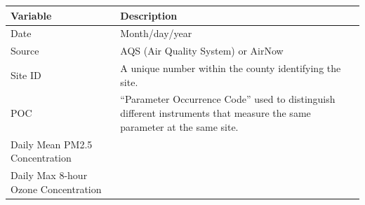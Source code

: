 \documentclass[12pt,]{article}
\begin{document}
\begin{longtable}[]{@{}ll@{}}
\toprule
\begin{minipage}[b]{0.65\columnwidth}\raggedright
Variable\strut
\end{minipage} & \begin{minipage}[b]{0.29\columnwidth}\raggedright
Description\strut
\end{minipage}\tabularnewline
\midrule
\endhead
\begin{minipage}[t]{0.65\columnwidth}\raggedright
Date\strut
\end{minipage} & \begin{minipage}[t]{0.29\columnwidth}\raggedright
Month/day/year\strut
\end{minipage}\tabularnewline
\begin{minipage}[t]{0.65\columnwidth}\raggedright
Source\strut
\end{minipage} & \begin{minipage}[t]{0.29\columnwidth}\raggedright
AQS (Air Quality System) or AirNow\strut
\end{minipage}\tabularnewline
\begin{minipage}[t]{0.65\columnwidth}\raggedright
Site ID\strut
\end{minipage} & \begin{minipage}[t]{0.29\columnwidth}\raggedright
A unique number within the county identifying the site.\strut
\end{minipage}\tabularnewline
\begin{minipage}[t]{0.65\columnwidth}\raggedright
POC\strut
\end{minipage} & \begin{minipage}[t]{0.29\columnwidth}\raggedright
``Parameter Occurrence Code'' used to distinguish different instruments
that measure the same parameter at the same site.\strut
\end{minipage}\tabularnewline
\begin{minipage}[t]{0.65\columnwidth}\raggedright
Daily Mean PM2.5 Concentration\strut
\end{minipage} & \begin{minipage}[t]{0.29\columnwidth}\raggedright
\strut
\end{minipage}\tabularnewline
\begin{minipage}[t]{0.65\columnwidth}\raggedright
Daily Max 8-hour Ozone Concentration\strut
\end{minipage} & \begin{minipage}[t]{0.29\columnwidth}\raggedright
\strut

\end{minipage}
\end{longtable}
\end{document}

